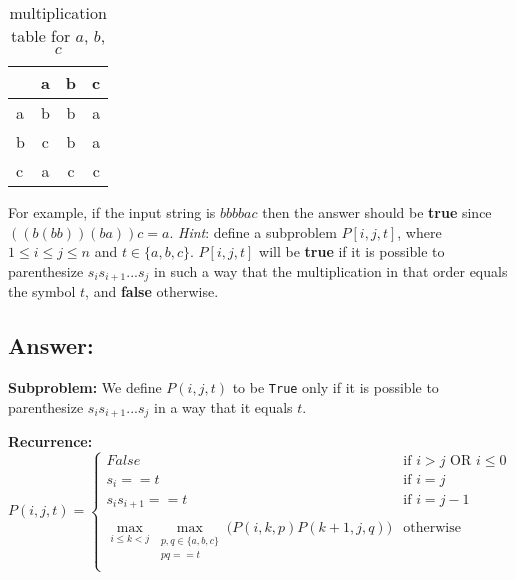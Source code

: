 \documentclass[12pt, letterpaper]{article}
\begin{document}
\begin{table}[h!]
    \centering
    \caption{multiplication table for $a$, $b$, $c$}
    \begin{tabular}{|l|c|c|c|}
        \hline
         & a & b & c \\
        \hline
        a & b & b & a \\
        b & c & b & a \\
        c & a & c & c \\
        \hline
    \end{tabular}
\end{table}

For example, if the input string is $bbbbac$ then the answer should be \textbf{true} since $((b(bb))(ba))c = a$. 
\textit{Hint}: define a subproblem $P[i,j,t]$, where $1 \leq i \leq j \leq n$ and $t \in \{ a, b, c \}$. 
$P[i,j,t]$ will be \textbf{true} if it is possible to parenthesize $s_i s_{i+1} ... s_j$ in such a way that the multiplication in that order equals the symbol $t$, and \textbf{false} otherwise.

\subsection*{Answer:}

\vspace{5mm}
\noindent\textbf{Subproblem:}
We define $P(i, j, t)$ to be \verb|True| only if it is possible to parenthesize $s_i s_{i+1} ... s_j$ in a way that it equals $t$.

\vspace{5mm}
\noindent\textbf{Recurrence:}
\begin{equation*}
    P(i, j, t) = 
    \begin{cases}
    False & \text{if } i > j \text{  OR  } i \leq 0 \\
    s_i == t & \text{if } i = j \\
    s_i s_{i+1} == t & \text{if } i = j - 1 \\
    &\\
    \max\limits_{i \leq k < j}\max\limits_{\substack{p, q \in \{a, b, c \}\\p q == t}}\big( P(i, k, p) P(k+1, j, q) \big) & \text{otherwise } \\
    \end{cases}
\end{equation*}
\end{document}
